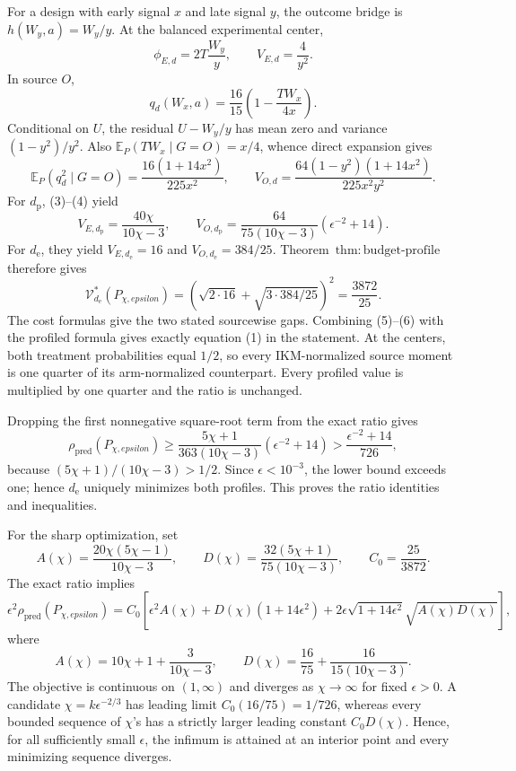 For a design with early signal \(x\) and late signal \(y\), the outcome bridge is \(h(W_y,a)=W_y/y\). At the balanced experimental center,
\[
 \phi_{E,d}=2T\frac{W_y}{y},
 \qquad V_{E,d}=\frac4{y^2}. \tag{3}
\]
In source \(O\),
\[
 q_d(W_x,a)=\frac{16}{15}\left(1-\frac{TW_x}{4x}\right).
\]
Conditional on \(U\), the residual \(U-W_y/y\) has mean zero and variance \((1-y^2)/y^2\). Also \(\mathbb E_P(TW_x\mid G=O)=x/4\), whence direct expansion gives
\[
 \mathbb E_P(q_d^2\mid G=O)=\frac{16(1+14x^2)}{225x^2},
 \qquad
 V_{O,d}=\frac{64(1-y^2)(1+14x^2)}{225x^2y^2}. \tag{4}
\]
For \(d_{\mathrm p}\), (3)--(4) yield
\[
 V_{E,d_{\mathrm p}}=\frac{40\chi}{10\chi-3},
 \qquad
 V_{O,d_{\mathrm p}}=\frac{64}{75(10\chi-3)}(\epsilon^{-2}+14). \tag{5}
\]
For \(d_{\mathrm e}\), they yield \(V_{E,d_{\mathrm e}}=16\) and \(V_{O,d_{\mathrm e}}=384/25\). Theorem~\(\mathrm{thm{:}budget\text{-}profile}\) therefore gives
\[
 \mathcal V_{d_{\mathrm e}}^*(P_{\chi,epsilon})
 =\left(\sqrt{2\cdot16}+\sqrt{3\cdot384/25}\right)^2
 =\frac{3872}{25}. \tag{6}
\]
The cost formulas give the two stated sourcewise gaps. Combining (5)--(6) with the profiled formula gives exactly equation (1) in the statement. At the centers, both treatment probabilities equal \(1/2\), so every IKM-normalized source moment is one quarter of its arm-normalized counterpart. Every profiled value is multiplied by one quarter and the ratio is unchanged.

Dropping the first nonnegative square-root term from the exact ratio gives
\[
 \rho_{\mathrm{pred}}(P_{\chi,epsilon})
 \ge \frac{5\chi+1}{363(10\chi-3)}(\epsilon^{-2}+14)
 >\frac{\epsilon^{-2}+14}{726}, \tag{7}
\]
because \((5\chi+1)/(10\chi-3)>1/2\). Since \(\epsilon<10^{-3}\), the lower bound exceeds one; hence \(d_{\mathrm e}\) uniquely minimizes both profiles. This proves the ratio identities and inequalities.

For the sharp optimization, set
\[
 A(\chi)=\frac{20\chi(5\chi-1)}{10\chi-3},
 \qquad
 D(\chi)=\frac{32(5\chi+1)}{75(10\chi-3)},
 \qquad C_0=\frac{25}{3872}.
\]
The exact ratio implies
\[
 \epsilon^2\rho_{\mathrm{pred}}(P_{\chi,epsilon})
 =C_0\left[\epsilon^2A(\chi)+D(\chi)(1+14\epsilon^2)
 +2\epsilon\sqrt{1+14\epsilon^2}\sqrt{A(\chi)D(\chi)}\right], \tag{8}
\]
where
\[
 A(\chi)=10\chi+1+\frac3{10\chi-3},
 \qquad
 D(\chi)=\frac{16}{75}+\frac{16}{15(10\chi-3)}. \tag{9}
\]
The objective is continuous on \((1,\infty)\) and diverges as \(\chi\to\infty\) for fixed \(\epsilon>0\). A candidate \(\chi=k\epsilon^{-2/3}\) has leading limit \(C_0(16/75)=1/726\), whereas every bounded sequence of \(\chi\)'s has a strictly larger leading constant \(C_0D(\chi)\). Hence, for all sufficiently small \(\epsilon\), the infimum is attained at an interior point and every minimizing sequence diverges.

